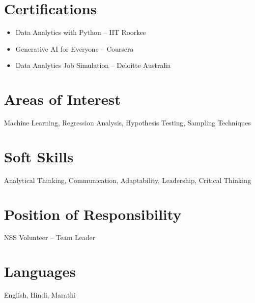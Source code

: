 \documentclass[a4paper,10pt]{article}
\begin{document}
\section*{Certifications}
\begin{itemize}[left=0pt]
    \item Data Analytics with Python – IIT Roorkee
    \item Generative AI for Everyone – Coursera
    \item Data Analytics Job Simulation – Deloitte Australia
\end{itemize}
\section*{Areas of Interest}
Machine Learning, Regression Analysis, Hypothesis Testing, Sampling Techniques
\section*{Soft Skills}
Analytical Thinking, Communication, Adaptability, Leadership, Critical Thinking
\section*{Position of Responsibility}
NSS Volunteer – Team Leader
\section*{Languages}
English, Hindi, Marathi
\end{document}
